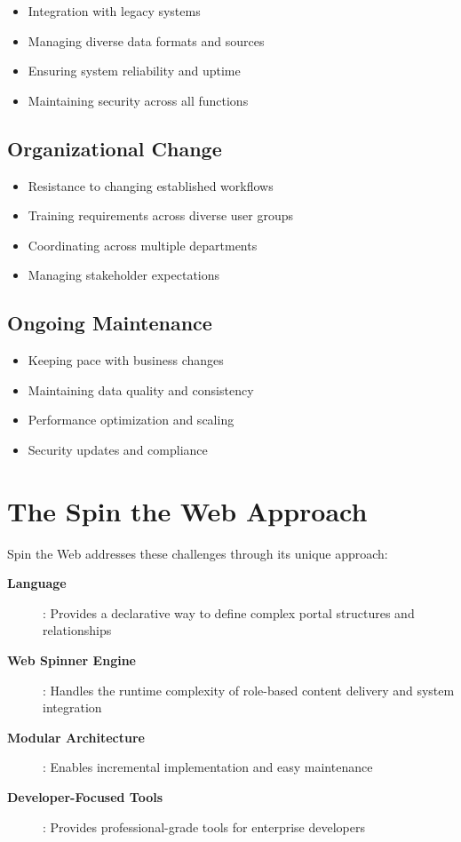 \begin{itemize}
    \item Integration with legacy systems
    \item Managing diverse data formats and sources
    \item Ensuring system reliability and uptime
    \item Maintaining security across all functions
\end{itemize}

\subsection{Organizational Change}

\begin{itemize}
    \item Resistance to changing established workflows
    \item Training requirements across diverse user groups
    \item Coordinating across multiple departments
    \item Managing stakeholder expectations
\end{itemize}

\subsection{Ongoing Maintenance}

\begin{itemize}
    \item Keeping pace with business changes
    \item Maintaining data quality and consistency
    \item Performance optimization and scaling
    \item Security updates and compliance
\end{itemize}

\section{The Spin the Web Approach}
\label{sec:spin-approach}

Spin the Web addresses these challenges through its unique approach:

\begin{description}
\item[\textbf{\wbdl{} Language}]: Provides a declarative way to define complex portal structures and relationships
\item[\textbf{Web Spinner Engine}]: Handles the runtime complexity of role-based content delivery and system integration
\item[\textbf{Modular Architecture}]: Enables incremental implementation and easy maintenance
\item[\textbf{Developer-Focused Tools}]: Provides professional-grade tools for enterprise developers
\end{description}

